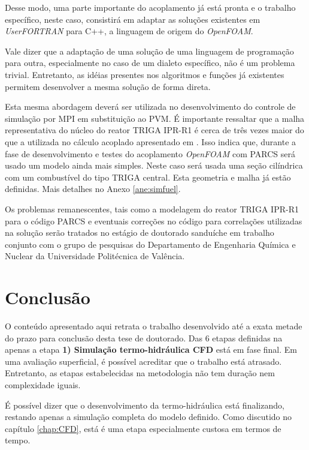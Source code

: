 \documentclass[12pt,openright,twoside,a4paper,english,french,spanish,brazil]{abntex2}
\begin{document}
Desse modo, uma parte importante do acoplamento já está pronta e o trabalho específico, neste caso, consistirá em 
adaptar as soluções existentes em \textit{UserFORTRAN} \cite[p.~463]{ANSYS2012} para C++, a linguagem de origem 
do \textit{OpenFOAM}.

Vale dizer que a adaptação de uma solução de uma linguagem de programação para outra, especialmente no caso 
de um dialeto específico, não é um problema trivial. Entretanto, as idéias presentes nos algoritmos e funções 
já existentes permitem desenvolver a mesma solução de forma direta.

Esta mesma abordagem deverá ser utilizada no desenvolvimento do controle de simulação por MPI em substituição ao 
PVM. É importante ressaltar que a malha representativa do núcleo do reator TRIGA IPR-R1 é cerca de três vezes 
maior do que a utilizada no cálculo acoplado apresentado em \cite{Monferrer2011}. Isso indica que, durante 
a fase de desenvolvimento e testes do acoplamento \textit{OpenFOAM} com PARCS será usado um modelo ainda mais 
simples. Neste caso será usada uma seção cilíndrica com um combustível do tipo TRIGA central. Esta geometria e 
malha já estão definidas. Mais detalhes no Anexo \ref{ane:simfuel}.

Os problemas remanescentes, tais como a modelagem do reator TRIGA IPR-R1 para o código PARCS e eventuais 
correções no código para correlações utilizadas na solução serão tratados no estágio de doutorado sanduíche 
em trabalho conjunto com o grupo de pesquisas do Departamento de Engenharia Química e Nuclear da Universidade 
Politécnica de Valência. 
% 

\chapter*[Conclusão]{Conclusão}

O conteúdo apresentado aqui retrata o trabalho desenvolvido até a exata metade do prazo para conclusão desta 
tese de doutorado. Das 6 etapas definidas na  apenas a etapa \textbf{1) Simulação termo-hidráulica CFD} 
 está em fase final. Em uma avaliação 
superficial, é possível acreditar que o trabalho está atrasado. Entretanto, as etapas estabelecidas na metodologia 
não tem duração nem complexidade iguais. 

É possível dizer que o desenvolvimento da termo-hidráulica está finalizando, restando apenas a simulação completa 
do modelo definido. Como discutido no capítulo \ref{chap:CFD}, está é uma etapa especialmente custosa em termos 
de tempo.
\end{document}
